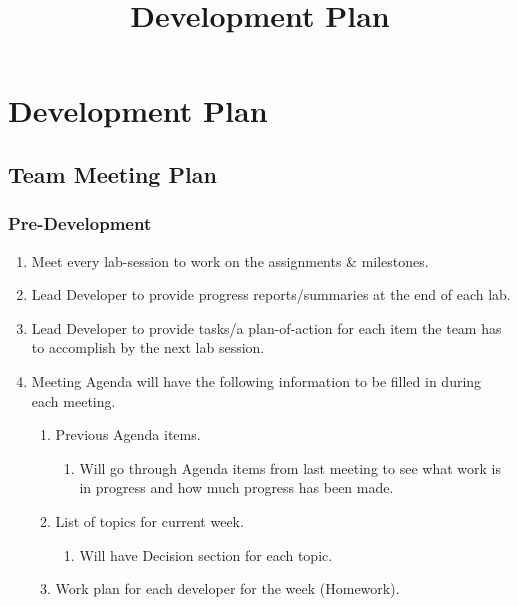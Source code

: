 \documentclass[11pt, oneside]{article}   	%
\title{Development Plan}
\author{}
\begin{document}
{}
\section*{Development Plan}
\subsection*{Team Meeting Plan}
\subsubsection*{Pre-Development}
\begin{enumerate}

\item Meet every lab-session to work on the assignments \& milestones.
\item Lead Developer to provide progress reports/summaries at the end of each lab.
\item Lead Developer to provide tasks/a plan-of-action for each item the team has to accomplish by the next lab session. 
\item Meeting Agenda will have the following information to be filled in during each meeting.

\begin{enumerate}
\item Previous Agenda items.
\begin{enumerate}
\item Will go through Agenda items from last meeting to see what work is in progress and how much progress has been made.
\end{enumerate}

\item List of topics for current week.
\begin{enumerate}
\item Will have Decision section for each topic.
\end{enumerate}

\item Work plan for each developer for the week (Homework).
\end{enumerate}

\end{enumerate}
\end{document}
